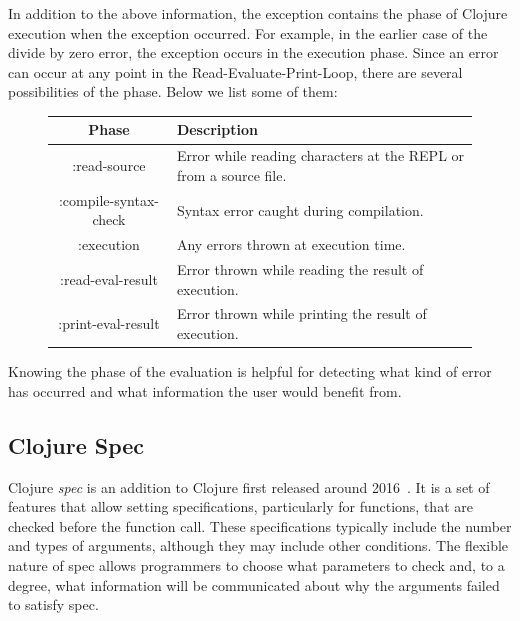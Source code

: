 \documentclass[12pt]{article}
\newcommand{\comment}[1]{}
\newcommand{\emcomment}[1]{\textcolor{ForestGreen}{\comment{Elena: {#1}}}}
\newcommand{\tkcomment}[1]{\textcolor{Teal}{\comment{Tristan: {#1}}}}
\begin{document}
In addition to the above information, the exception contains the phase of Clojure execution when the exception occurred. For example, in the earlier case of the divide by zero error, the exception occurs in the execution phase. 
%
%
Since an error can occur at any point in the Read-Evaluate-Print-Loop, there are several possibilities of the phase. Below we list some of them:
	\begin{figure}[h]
		\centering
		\begin{tabular}{|c|l|}
			\hline
			\textbf{Phase} & \textbf{Description} \\
			\hline
			:read-source & Error while reading characters at the REPL or from a source file. \\
			:compile-syntax-check & Syntax error caught during compilation. \\
			:execution & Any errors thrown at execution time. \\
			:read-eval-result & Error thrown while reading the result of execution. \\
			:print-eval-result & Error thrown while printing the result of execution. \\
			\hline
		\end{tabular}
	\end{figure}

Knowing the phase of the evaluation is helpful for detecting what kind of error has occurred and what information the user would benefit from.


\subsection{Clojure Spec}\label{subsec:spec}
Clojure \textit{spec} is an addition to Clojure first released around 2016~\cite{spec-overview}.
It is a set of features that allow setting specifications, particularly for functions, that are checked before the function call. 
These specifications typically include the number and types of arguments, although they may include other conditions.
The flexible nature of spec allows programmers to choose what parameters to check and, to a degree, what information will be communicated about why the arguments failed to satisfy spec.
\end{document}

